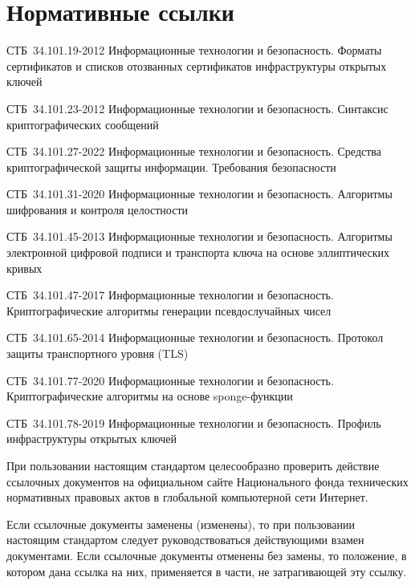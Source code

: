 \chapter{Нормативные ссылки}\label{Refs}

СТБ~34.101.19-2012 Информационные технологии и безопасность. Форматы
сертификатов и списков отозванных сертификатов инфраструктуры открытых ключей

СТБ~34.101.23-2012 Информационные технологии и безопасность. Синтаксис
криптографических сообщений

СТБ~34.101.27-2022 Информационные технологии и безопасность. Средства
криптографической защиты информации. Требования безопасности

СТБ~34.101.31-2020 Информационные технологии и безопасность. Алгоритмы 
шифрования и контроля целостности  

СТБ~34.101.45-2013 Информационные технологии и безопасность. Алгоритмы 
электронной цифровой подписи и транспорта ключа на основе эллиптических кривых

СТБ~34.101.47-2017 Информационные технологии и безопасность. Криптографические
алгоритмы генерации псевдослучайных чисел

СТБ~34.101.65-2014 Информационные технологии и безопасность. Протокол защиты
транспортного уровня (TLS)

СТБ~34.101.77-2020 Информационные технологии и безопасность. Криптографические
алгоритмы на основе sponge-функции

СТБ~34.101.78-2019 Информационные технологии и безопасность. Профиль
инфраструктуры открытых ключей

\begin{note*}
При пользовании настоящим стандартом целесообразно проверить действие
ссылочных документов на официальном сайте Национального фонда
технических нормативных правовых актов в глобальной компьютерной сети Интернет.

Если ссылочные документы заменены (изменены), то при пользовании настоящим
стандартом следует руководствоваться действующими взамен документами. Если
ссылочные документы отменены без замены, то положение, в котором дана ссылка на
них, применяется в части, не затрагивающей эту ссылку.
\end{note*}

